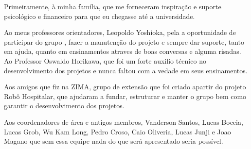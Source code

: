 \documentclass[]{politex}
\begin{document}
\capa
\falsafolhaderosto
\folhaderosto





\begin{agradecimentos}

Primeiramente, à minha família, que me forneceram inspiração e suporte psicológico e financeiro para que eu chegasse até a universidade.

Ao meus professores orientadores, Leopoldo Yoshioka, pela a oportunidade de participar do grupo , fazer a manutenção do projeto e sempre dar suporte, tanto em ajuda, quanto em ensinamentos atraves de boas conversas e alguma risadas. Ao Professor Oswaldo Horikawa, que foi um forte auxilio técnico no desenvolvimento dos projetos e nunca faltou com a vedade em seus ensinamentos.

Aos amigos que fiz na ZIMA, grupo de extensão que foi criado apartir do projeto Robô Hospitalar, que ajudaram a fundar, estruturar e manter o grupo bem como garantir o desenvolvimento dos projetos. 

Aos coordenadores de área e antigos membros, Vanderson Santos, Lucas Boccia, Lucas Grob, Wu Kam Long, Pedro Croso, Caio Oliveria, Lucas Junji e Joao Magano que sem essa equipe nada do que será apresentado seria possível.


\end{agradecimentos}

\end{document}
